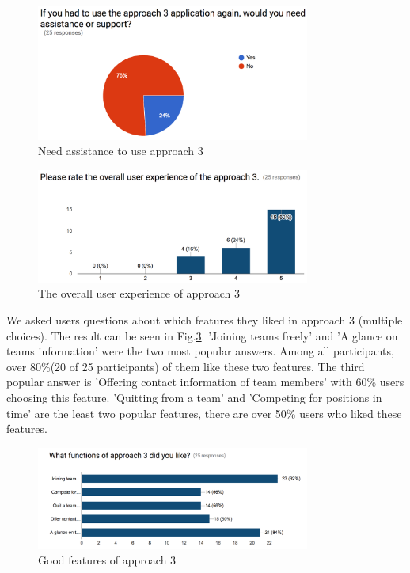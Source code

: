 \documentclass[conference]{IEEEtran}
\begin{document}
\begin{figure}[H]
    \centering
    \includegraphics[width=9cm]{image/app3_useagain.png}
    \caption{Need assistance to use approach 3}
    \label{app3.ua}
\end{figure}

\begin{figure}[H]
    \centering
    \includegraphics[width=9cm]{image/app3_overall.png}
    \caption{The overall user experience of approach 3}
    \label{app3.ov}
\end{figure}

We asked users questions about which features they liked in approach 3 (multiple choices). The result can be seen in Fig.\ref{app3.gf}. 'Joining teams freely' and 'A glance on teams information' were the two most popular answers. Among all participants, over 80\%(20 of 25 participants) of them like these two features. The third popular answer is 'Offering contact information of team members' with 60\% users choosing this feature. 'Quitting from a team' and 'Competing for positions in time' are the least two popular features, there are over 50\% users who liked these features.

\begin{figure}[H]
    \centering
    \includegraphics[width=9cm]{image/app3_goodfeatures.png}
    \caption{Good features of approach 3}
    \label{app3.gf}
\end{figure}
\end{document}
